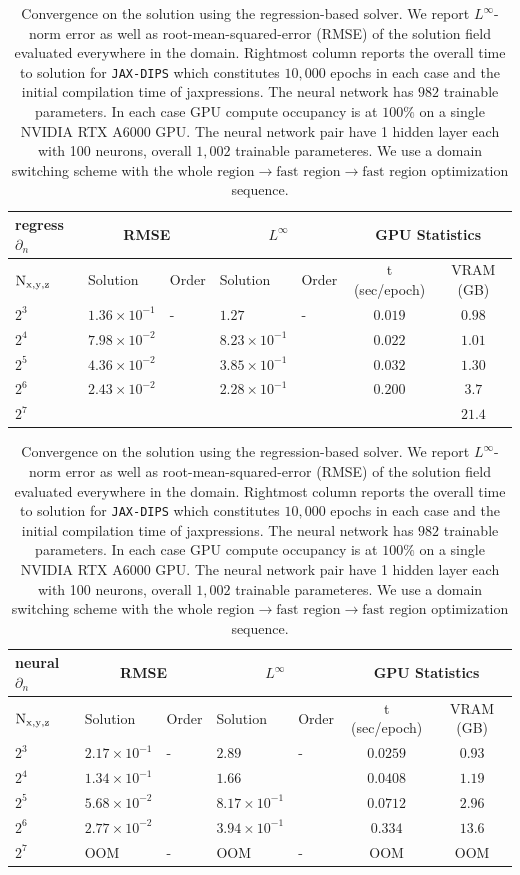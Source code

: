\documentclass{elsarticle}
\begin{document}
\begin{table}[ht]
\begin{center}
\begin{tabular}{|l||ll|ll|c|c|}
\hline
regress $\partial_n$ & \multicolumn{2}{c|}{RMSE}& \multicolumn{2}{c|}{$L^\infty$} & \multicolumn{2}{c|}{GPU Statistics} \\
\hline
$\rm N_{x,y,z}$   &   Solution    &   Order   &   Solution   &   Order & t (sec/epoch) & VRAM (GB)\\
\hline 
$2^3$ & $ 1.36\times 10^{-1}$ &  -     & $ 1.27$   &   -   & $ 0.019  $  & $  0.98 $ \\
$2^4$ & $ 7.98\times 10^{-2} $ &  $ $   & $ 8.23\times 10^{-1} $   & $ $   & $ 0.022  $  & $ 1.01  $ \\ 
$2^5$ & $ 4.36\times 10^{-2} $ &  $ $   & $ 3.85\times 10^{-1} $   & $  $   & $ 0.032  $  & $ 1.30  $ \\ 
$2^6$ & $2.43\times 10^{-2} $ &  $ $   & $ 2.28\times 10^{-1}$   & $ $   & $  0.200 $  & $ 3.7 $ \\ 
$2^7$ & $ $ &  $ $   & $ $   & $ $   & $   $  & $21.4 $ \\ \hline
\end{tabular}
\begin{tabular}{|l||ll|ll|c|c|}
\hline
neural $\partial_n$ & \multicolumn{2}{c|}{RMSE}& \multicolumn{2}{c|}{$L^\infty$} & \multicolumn{2}{c|}{GPU Statistics} \\
\hline
$\rm N_{x,y,z}$   &   Solution    &   Order   &   Solution   &   Order & t (sec/epoch) & VRAM (GB)\\
\hline 
$2^3$ & $2.17\times 10^{-1} $ &  -     & $2.89 $  &   -   & $0.0259 $ & $ 0.93$ \\
$2^4$ & $ 1.34\times 10^{-1	}$ &  $ $   & $ 1.66$  & $ $   & $ 0.0408$ & $1.19 $ \\ 
$2^5$ & $5.68\times 10^{-2} $ &  $ $   & $ 8.17\times 10^{-1}$  & $ $   & $ 0.0712$ & $ 2.96$ \\ 
$2^6$ & $ 2.77\times 10^{-2}$ &  $ $   & $3.94\times 10^{-1} $  & $ $   & $ 0.334 $ & $ 13.6$ \\ 
$2^7$ & OOM  &  -   & OOM  & -   & OOM & OOM \\ \hline
\end{tabular}
\caption{Convergence on the solution using the regression-based solver. We report $L^\infty$-norm error as well as root-mean-squared-error (RMSE) of the solution field evaluated everywhere in the domain. Rightmost column reports the overall time to solution for \texttt{JAX-DIPS} which constitutes $10,000$ epochs in each case and the initial compilation time of jaxpressions. The neural network has $982$ trainable parameters. In each case GPU compute occupancy is at $100\%$ on a single NVIDIA RTX A6000 GPU. The neural network pair have 1 hidden layer each with 100 neurons, overall $1,002$ trainable parameteres. We use a domain switching scheme with the $\textrm{whole region} \rightarrow \textrm{fast region} \rightarrow \textrm{fast region}$ optimization sequence.}
\end{center}
\end{table}
\end{document}
